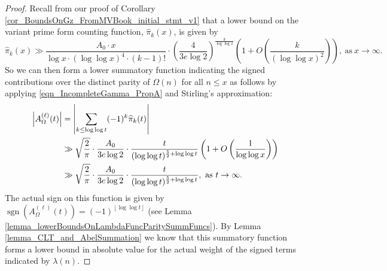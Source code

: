 \documentclass[11pt,reqno,a4letter]{article}
\numberwithin{figure}{section}
\numberwithin{table}{section}
\newcommand{\floor}[1]{\left\lfloor #1 \right\rfloor}
\theoremstyle{plain}
\numberwithin{theorem}{section}
\theoremstyle{definition}
\newcommand{\SuccSim}[0]{\overset{_{\scriptsize{\blacktriangle}}}{\succsim}}
\renewcommand{\SuccSim}[0]{\ensuremath{\gg}}
\begin{document}
\begin{proof} 
Recall from our proof of Corollary \ref{cor_BoundsOnGz_FromMVBook_initial_stmt_v1} that 
a lower bound on the variant prime form counting function, $\widehat{\pi}_k(x)$, is given by 
\[
\widehat{\pi}_k(x) \SuccSim \frac{A_0 \cdot x}{\log x \cdot (\log\log x)^4 \cdot (k-1)!} \cdot 
     \left(\frac{4}{3e\log 2}\right)^{\frac{k}{\log\log x}} \left( 
     1 + O\left(\frac{k}{(\log\log x)^2}\right) 
     \right), \mathrm{\ as\ } x \rightarrow \infty. 
\]
So we can then form a lower summatory function indicating the signed contributions over the distinct 
parity of $\Omega(n)$ for all $n \leq x$ as follows by applying 
\eqref{eqn_IncompleteGamma_PropA} and Stirling's approximation: 
\begin{align} 
\notag 
\left\lvert A_{\Omega}^{(\ell)}(t) \right\rvert & = 
     \left\lvert \sum_{k \leq \log\log t} (-1)^k \widehat{\pi}_k(t) \right\rvert \\ 
\notag 
     & \SuccSim  
     \sqrt{\frac{2}{\pi}} \cdot \frac{A_0}{3e \log 2} \cdot 
     \frac{t}{(\log\log t)^{\frac{5}{2} + \log\log t}} \left( 
     1 + O\left(\frac{1}{\log\log x}\right) 
     \right) \\ 
\label{proof_thm_GInvFunc_v0} 
     & \gg \sqrt{\frac{2}{\pi}} \cdot \frac{A_0}{3e \log 2} \cdot 
     \frac{t}{(\log\log t)^{\frac{5}{2} + \log\log t}}, 
     \mathrm{\ as\ } t \rightarrow \infty. 
\end{align} 
The actual sign on this function is given by 
$\operatorname{sgn}(A_{\Omega}^{(\ell)}(t)) = (-1)^{\floor{\log\log t}}$ 
(see Lemma \ref{lemma_lowerBoundsOnLambdaFuncParitySummFuncs}). 
By Lemma \ref{lemma_CLT_and_AbelSummation}
we know that this summatory function forms a lower bound in absolute value for the 
actual weight of the signed terms indicated by $\lambda(n)$. 


\end{proof}
\end{document}
